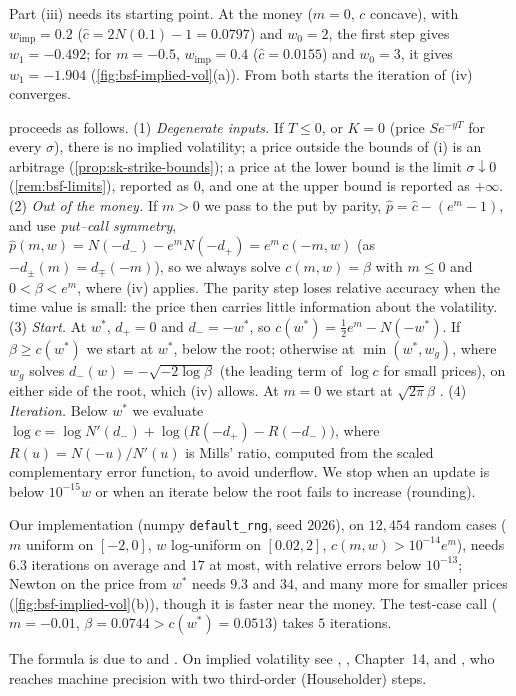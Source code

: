 \begin{remark}\label{rem:bsf-newton-fails}
Part (iii) needs its starting point. At the money ($m=0$, $c$ concave), with $w_{\mathrm{imp}}=0.2$
($\hat c=2N(0.1)-1=0.0797$) and $w_0=2$, the first step gives $w_1=-0.492$; for $m=-0.5$, $w_{\mathrm{imp}}=0.4$
($\hat c=0.0155$) and $w_0=3$, it gives $w_1=-1.904$ (\cref{fig:bsf-implied-vol}(a)). From both starts the
iteration of (iv) converges.
\end{remark}

\begin{remark}\label{rem:bsf-iv-algorithm}
 proceeds as follows.
(1) \emph{Degenerate inputs.} If $T\le0$, or $K=0$ (price $Se^{-yT}$ for every $\sigma$), there is no implied
volatility; a price outside the bounds of (i) is an arbitrage (\cref{prop:sk-strike-bounds}); a price at the
lower bound is the limit $\sigma\downarrow0$ (\cref{rem:bsf-limits}), reported as $0$, and one at the upper
bound is reported as $+\infty$.
(2) \emph{Out of the money.} If $m>0$ we pass to the put by parity, $\hat p=\hat c-(e^m-1)$, and use
\emph{put--call symmetry}, $\hat p(m,w)=N(-d_-)-e^mN(-d_+)=e^m\,c(-m,w)$ (as $-d_\pm(m)=d_\mp(-m)$), so we always
solve $c(m,w)=\beta$ with $m\le0$ and $0<\beta<e^m$, where (iv) applies. The parity step loses relative accuracy
when the time value is small: the price then carries little information about the volatility.
(3) \emph{Start.} At $w^*$, $d_+=0$ and $d_-=-w^*$, so $c(w^*)=\frac12e^m-N(-w^*)$. If $\beta\ge c(w^*)$ we start
at $w^*$, below the root; otherwise at $\min(w^*,w_g)$, where $w_g$ solves $d_-(w)=-\sqrt{-2\log\beta}$ (the
leading term of $\log c$ for small prices), on either side of the root, which (iv) allows. At $m=0$ we start
at $\sqrt{2\pi}\beta$ \citep{brenner-subrahmanyam}.
(4) \emph{Iteration.} Below $w^*$ we evaluate $\log c=\log N'(d_-)+\log\big(R(-d_+)-R(-d_-)\big)$, where
$R(u)=N(-u)/N'(u)$ is Mills' ratio, computed from the scaled complementary error function, to avoid underflow. We stop when an update is below $10^{-15}w$ or when an
iterate below the root fails to increase (rounding).

Our implementation (numpy \texttt{default\_rng}, seed $2026$), on $12{,}454$ random cases ($m$ uniform on
$[-2,0]$, $w$ log-uniform on $[0.02,2]$, $c(m,w)>10^{-14}e^m$), needs $6.3$ iterations on average and $17$ at
most, with relative errors below $10^{-13}$; Newton on the price from $w^*$ needs $9.3$ and $34$, and many more
for smaller prices (\cref{fig:bsf-implied-vol}(b)), though it is faster near the money. The test-case call
($m=-0.01$, $\beta=0.0744>c(w^*)=0.0513$) takes $5$ iterations.
\end{remark}



\furtherreading
The formula is due to \textcite{black-scholes} and \textcite{merton1973}. On implied volatility see
\textcite{manaster-koehler}, \textcite{higham-option}, Chapter~14, and \textcite{jaeckel-rational}, who reaches machine
precision with two third-order (Householder) steps.

